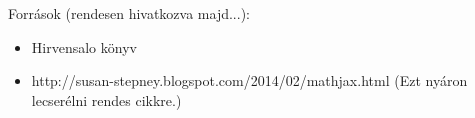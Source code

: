 \documentclass[11pt,a4paper,oneside]{report}
\begin{document}
\selectthesislanguage

\tableofcontents\vfill
{}








Források (rendesen hivatkozva majd...):
\begin{itemize}
  \item Hirvensalo könyv
  \item http://susan-stepney.blogspot.com/2014/02/mathjax.html (Ezt nyáron lecserélni rendes cikkre.)
\end{itemize}


\end{document}
